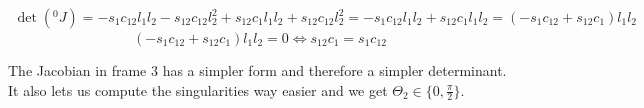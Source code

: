 \documentclass[10pt,a4paper]{article}
\begin{document}
\begin{align*}
  \det({}^{0}J) = -s_{1}c_{12}l_{1}l_{2} - s_{12}c_{12}l_{2}^{2} + s_{12}c_{1}l_{1}l_{2} + s_{12}c_{12}l_{2}^{2} = -s_{1}c_{12}l_{1}l_{2} + s_{12}c_{1}l_{1}l_{2} = (-s_{1}c_{12} + s_{12}c_{1})l_{1}l_{2}
\end{align*}
\begin{equation*}
  (-s_{1}c_{12} + s_{12}c_{1})l_{1}l_{2} = 0 \Leftrightarrow s_{12}c_{1} = s_{1}c_{12}
\end{equation*}

The Jacobian in frame $3$ has a simpler form and therefore a simpler determinant.
It also lets us compute the singularities way easier and we get $\Theta_{2} \in \{ 0, \frac{\pi}{2} \}$.
\end{document}
